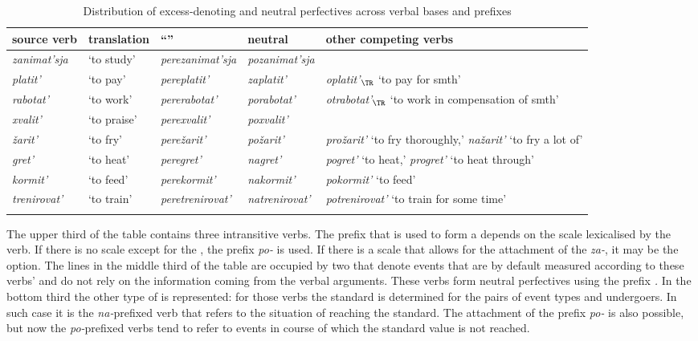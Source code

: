 \begin{sidewaystable}
\caption{Distribution of excess-denoting and neutral perfectives across verbal bases and prefixes \label{table:competition}}
\begin{tabularx}{\textwidth}{l  l  l  l  Q}
\lsptoprule
source verb& translation & ``'' & neutral & other competing verbs\\ \midrule
\textit{zanimat'sja} & `to study' & \textit{perezanimat'sja} & \textit{pozanimat'sja} & \\
\textit{platit'} & `to pay' & \textit{pereplatit'} & \textit{zaplatit'} & \textit{oplatit'$_{\TR}$} `to pay for smth'\\
\textit{rabotat'} & `to work' & \textit{pererabotat'} & \textit{porabotat'} & \textit{otrabotat'$_{\TR}$} `to work in compensation of smth'\\

\tablevspace
\textit{xvalit'} & `to praise' & \textit{perexvalit'} & \textit{poxvalit'} &\\
\textit{\v{z}arit'} & `to fry' & \textit{pere\v{z}arit'} & \textit{po\v{z}arit'} & \textit{pro\v{z}arit'} `to fry thoroughly,' \textit{na\v{z}arit'} `to fry a lot of'\\ 

\tablevspace
\textit{gret'} & `to heat' & \textit{peregret'} & \textit{nagret'} & \textit{pogret'} `to heat,' \textit{progret'} `to heat through'\\ 
\textit{kormit'} & `to feed' & \textit{perekormit'} & \textit{nakormit'} & \textit{pokormit'} `to feed'\\
\textit{trenirovat'} & `to train' & \textit{peretrenirovat'} & \textit{natrenirovat'} & \textit{potrenirovat'} `to train for some time'\\\lspbottomrule
\end{tabularx}
\end{sidewaystable}

The upper third of the table contains three intransitive verbs. The prefix that is used to form a  depends on the scale lexicalised by the verb. If there is no scale except for the , the prefix \textit{po-} is used. If there is a scale that allows for the attachment of the  \textit{za-}, it may be the option. The lines in the middle third of the table are occupied by two  that denote events that are by default measured according to these verbs'   and do not rely on the information coming from the verbal arguments. These verbs form neutral perfectives using the prefix \textit{.} In the bottom third the other type of  is represented: for those verbs the standard is determined for the pairs of event types and undergoers. In such case it is the \textit{na-}prefixed verb that refers to the situation of reaching the standard. The attachment of the prefix \textit{po-} is also possible, but now the \textit{po-}prefixed verbs tend to refer to events in course of which the standard value is not reached.

